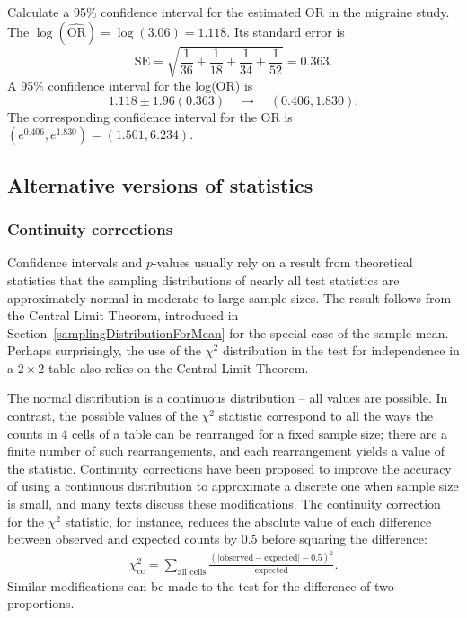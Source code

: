 \begin{examplewrap}
\begin{nexample}{Calculate a 95\% confidence interval for the estimated OR in the migraine study.}
The $\log(\widehat{\text{OR}}) = \log(3.06) = 1.118$.   Its standard error is
    \[
      \text{SE} = \sqrt{\frac{1}{36} + \frac{1}{18}
   + \frac{1}{34} + \frac{1}{52}} = 0.363.
 \]
A 95\% confidence interval for the log(OR) is
\[
      1.118 \pm 1.96(0.363) \quad \to \quad (0.406, 1.830).
\]
The corresponding confidence interval for the OR is $(e^{0.406}, e^{1.830}) = (1.501, 6.234).$
\end{nexample}
\end{examplewrap}

\subsection{Alternative versions of statistics}
\label{alternativeTestStatisticsBinaryData}

\subsubsection{Continuity corrections}

Confidence intervals and $p$-values usually rely on a result from theoretical statistics that the sampling distributions of nearly all test statistics are approximately normal in moderate to large sample sizes.  The result follows from the Central Limit Theorem, introduced in Section~\ref{samplingDistributionForMean} for the special case of the sample mean. Perhaps surprisingly, the use of the $\chi^2$  distribution in the test for independence in a $2 \times 2$ table also relies on the Central Limit Theorem.

The normal distribution is a continuous distribution -- all values are possible. In contrast, the possible values of the $\chi^2$ statistic correspond to all the ways the counts in 4 cells of a table can be rearranged for a fixed sample size; there are a finite number of such rearrangements, and each rearrangement yields a value of the statistic. Continuity corrections have been proposed to improve the accuracy of using a continuous distribution to approximate a discrete one when sample size is small, and many texts discuss these modifications. The continuity correction for the $\chi^2$ statistic, for instance, reduces the absolute value of each difference between observed and expected counts by 0.5 before squaring the difference:
\begin{align}
  \chi^2_{\text{cc}} = \sum_{\text{all cells}} \frac{(|\text{observed} - \text{expected}| - 0.5)^2}{\text{expected}}. \label{eqn:fisherYatesTest}
\end{align}
Similar modifications can be made to the test for the difference of two proportions.

